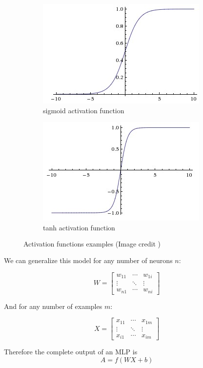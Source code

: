 \begin{figure}
    \centering
    \begin{subfigure}{.5\textwidth}
        \centering
        \includegraphics[width=.4\linewidth]{Figures/sigmoid}
        \caption{sigmoid activation function}
        \label{fig:sub1}
    \end{subfigure}%
    \begin{subfigure}{.5\textwidth}
        \centering
        \includegraphics[width=.4\linewidth]{Figures/tanh}
        \caption{tanh activation function}
        \label{fig:sub2}
    \end{subfigure}
    \caption[Activation functions]{Activation functions examples (Image credit \cite{cs231n})}
    \label{fig:activations}
\end{figure}



We can generalize this model for any number of neurons $n$:

$$
W=\left[
\begin{array}{ccc}
   w_{11} & \cdots & w_{1i} \\
   \vdots & \ddots & \vdots \\
   w_{n1} & \cdots & w_{ni}
\end{array}
\right]
$$

And for any number of examples $m$:

$$
X=\left[
\begin{array}{ccc}
   x_{11} & \cdots & x_{1m} \\
   \vdots & \ddots & \vdots \\
   x_{i1} & \cdots & x_{im}
\end{array}
\right]
$$

Therefore the complete output of an MLP is
$$ A = f(WX + b) $$


